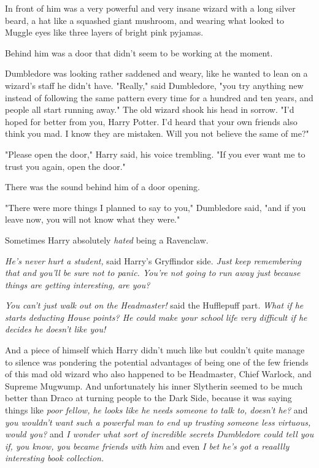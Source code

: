 In front of him was a very powerful and very insane wizard with a long silver
beard, a hat like a squashed giant mushroom, and wearing what looked to Muggle
eyes like three layers of bright pink pyjamas.

Behind him was a door that didn’t seem to be working at the moment.

Dumbledore was looking rather saddened and weary, like he wanted to lean on a
wizard’s staff he didn’t have. "Really," said Dumbledore, "you try anything new
instead of following the same pattern every time for a hundred and ten years,
and people all start running away." The old wizard shook his head in sorrow.
"I’d hoped for better from you, Harry Potter. I’d heard that your own friends
also think you mad. I know they are mistaken. Will you not believe the same of
me?"

"Please open the door," Harry said, his voice trembling. "If you ever want me
to trust you again, open the door."

There was the sound behind him of a door opening.

"There were more things I planned to say to you," Dumbledore said, "and if you
leave now, you will not know what they were."

Sometimes Harry absolutely \emph{hated} being a Ravenclaw.

\emph{He’s never hurt a student,} said Harry’s Gryffindor side. \emph{Just keep
remembering that and you’ll be sure not to panic. You’re not going to run away
just because things are getting interesting, are you?}

\emph{You can’t just walk out on the Headmaster!} said the Hufflepuff part.
\emph{What if he starts deducting House points? He could make your school life
very difficult if he decides he doesn’t like you!}

And a piece of himself which Harry didn’t much like but couldn’t quite manage
to silence was pondering the potential advantages of being one of the few
friends of this mad old wizard who also happened to be Headmaster, Chief
Warlock, and Supreme Mugwump. And unfortunately his inner Slytherin seemed to
be much better than Draco at turning people to the Dark Side, because it was
saying things like \emph{poor fellow, he looks like he needs someone to talk
to, doesn’t he?} and \emph{you wouldn’t want such a powerful man to end up
trusting someone less virtuous, would you?} and \emph{I wonder what sort of
incredible secrets Dumbledore could tell you if, you know, you became friends
with him} and even \emph{I bet he’s got a reaallly interesting book collection.}

